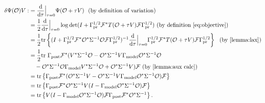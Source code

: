 \documentclass{amsart}
\numberwithin{equation}{section}
\providecommand{\DIFaddbegin}{} %
\providecommand{\DIFdelend}{} %
\begin{document}
\DIFdelend \DIFaddbegin \begin{align*}%
  \begin{split}
    \delta \tar(\obs) V 
    :&= \frac{\der}{\der\tau} \Big |_{\tau=0} \tar(\obs + \tau V)\  \text{ (by definition of variation)}\\
    &= \frac12 \frac{\der}{\der \tau} \Big |_{\tau=0} \log \det 
    (I + \prcov^{1/2} \fwd^* T(\obs+\tau V)\fwd \prcov^{1/2} ) \text{ (by definition \eqref{eq:objective})}\\
    &= \frac12 \tr{( I + \prcov^{1/2} \fwd^* \obs^* \Sigma^{-1}
    \obs\fwd \prcov^{1/2} )^{-1}
    \frac{\der}{\der \tau} \Big |_{\tau=0}
    \prcov^{1/2} \fwd^* T(\obs+\tau V) \fwd \prcov^{1/2}}\ \text{ (by \ref{lemma:lax})}\\
    &= \frac12 \ttr{\postcov \fwd^* (V^* \Sigma^{-1} \obs 
      - \obs^*\Sigma^{-1} V\modcov \obs^* \Sigma^{-1}\obs \\
      &\ \ \ - \obs^* \Sigma^{-1} \obs \modcov V^* \Sigma^{-1}\obs 
      + \obs^* \Sigma^{-1} V ) \fwd}  \text{ (by \ref{lemma:aux calc})}\\
    &= \tr{\postcov \fwd^* ( \obs^* \Sigma^{-1} V 
    - \obs^*\Sigma^{-1} V\modcov \obs^* \Sigma^{-1}\obs ) \fwd} \\
    &= \tr{\postcov \fwd^* \obs^* \Sigma^{-1} V 
    ( I - \modcov \obs^* \Sigma^{-1}\obs ) \fwd} \\
    &= \tr{V ( I - \modcov \obs^* \Sigma^{-1}\obs )
    \fwd \postcov \fwd^* \obs^* \Sigma^{-1}}.
  \end{split}
\end{align*} 
\end{document}
